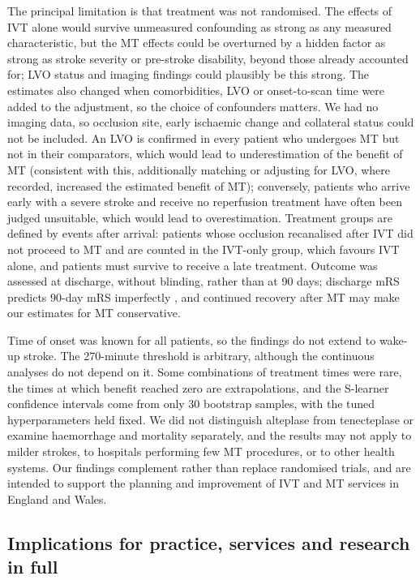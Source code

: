 The principal limitation is that treatment was not randomised. The effects of IVT alone would survive unmeasured confounding as strong as any measured characteristic, but the MT effects could be overturned by a hidden factor as strong as stroke severity or pre-stroke disability, beyond those already accounted for; LVO status and imaging findings could plausibly be this strong. The estimates also changed when comorbidities, LVO or onset-to-scan time were added to the adjustment, so the choice of confounders matters. We had no imaging data, so occlusion site, early ischaemic change and collateral status could not be included. An LVO is confirmed in every patient who undergoes MT but not in their comparators, which would lead to underestimation of the benefit of MT (consistent with this, additionally matching or adjusting for LVO, where recorded, increased the estimated benefit of MT); conversely, patients who arrive early with a severe stroke and receive no reperfusion treatment have often been judged unsuitable, which would lead to overestimation. Treatment groups are defined by events after arrival: patients whose occlusion recanalised after IVT did not proceed to MT and are counted in the IVT-only group, which favours IVT alone, and patients must survive to receive a late treatment. Outcome was assessed at discharge, without blinding, rather than at 90 days; discharge mRS predicts 90-day mRS imperfectly , and continued recovery after MT may make our estimates for MT conservative.

Time of onset was known for all patients, so the findings do not extend to wake-up stroke. The 270-minute threshold is arbitrary, although the continuous analyses do not depend on it. Some combinations of treatment times were rare, the times at which benefit reached zero are extrapolations, and the S-learner confidence intervals come from only 30 bootstrap samples, with the tuned hyperparameters held fixed. We did not distinguish alteplase from tenecteplase or examine haemorrhage and mortality separately, and the results may not apply to milder strokes, to hospitals performing few MT procedures, or to other health systems. Our findings complement rather than replace randomised trials, and are intended to support the planning and improvement of IVT and MT services in England and Wales.

\subsection{Implications for practice, services and research in full}\label{sec:supp_implications}

